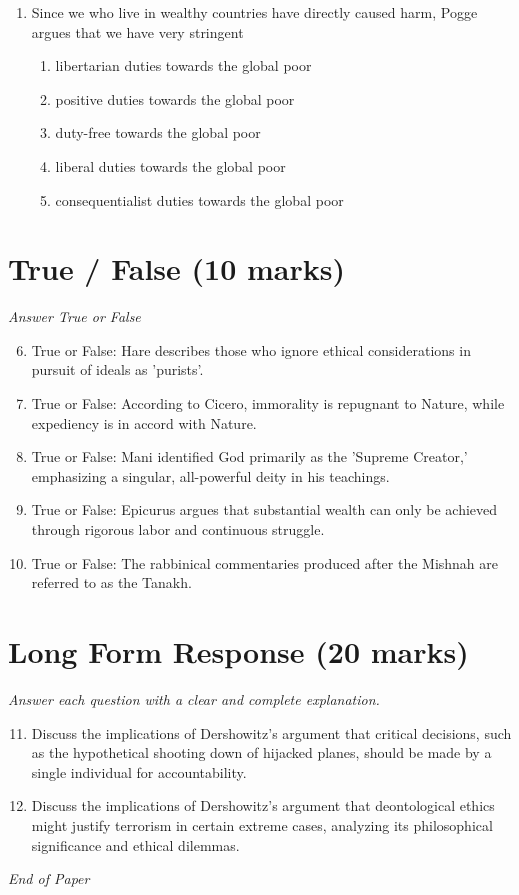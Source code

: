 \documentclass[12pt]{article}
\begin{document}
\begin{enumerate}[label=\arabic*.]
\begin{enumerate}[label=(\alph*)]
\end{enumerate}
\item Since we who live in wealthy countries have directly caused harm, Pogge argues that we have very stringent
\begin{enumerate}[label=(\alph*)]
    \item libertarian duties towards the global poor
    \item positive duties towards the global poor
    \item duty-free towards the global poor
    \item liberal duties towards the global poor
    \item consequentialist duties towards the global poor
\end{enumerate}
\end{enumerate}

\section*{True / False (10 marks)}
\textit{Answer True or False}
\begin{enumerate}[label=\arabic*.]
\setcounter{enumi}{5}
\item True or False: Hare describes those who ignore ethical considerations in pursuit of ideals as 'purists'.
\item True or False: According to Cicero, immorality is repugnant to Nature, while expediency is in accord with Nature.
\item True or False: Mani identified God primarily as the 'Supreme Creator,' emphasizing a singular, all-powerful deity in his teachings.
\item True or False: Epicurus argues that substantial wealth can only be achieved through rigorous labor and continuous struggle.
\item True or False: The rabbinical commentaries produced after the Mishnah are referred to as the Tanakh.
\end{enumerate}

\section*{Long Form Response (20 marks)}
\textit{Answer each question with a clear and complete explanation.}
\begin{enumerate}[label=\arabic*.]
\setcounter{enumi}{10}
\item Discuss the implications of Dershowitz's argument that critical decisions, such as the hypothetical shooting down of hijacked planes, should be made by a single individual for accountability.
\item Discuss the implications of Dershowitz's argument that deontological ethics might justify terrorism in certain extreme cases, analyzing its philosophical significance and ethical dilemmas.
\end{enumerate}

\vfill
\noindent\textit{End of Paper}
\end{document}
